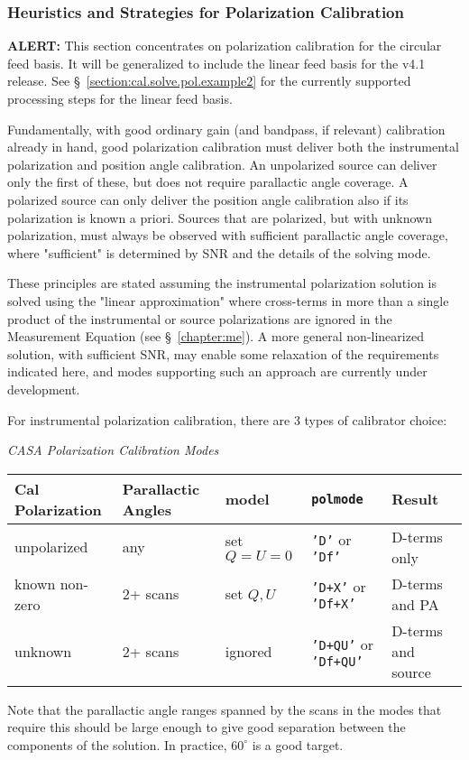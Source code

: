 
\subsubsection{Heuristics and Strategies for Polarization Calibration }
\label{section:cal.solve.pol.hstics}


{\bf ALERT:} This section concentrates on polarization calibration for
the circular feed basis.  It will be generalized to include the linear
feed basis for the v4.1 release.  See
\S~\ref{section:cal.solve.pol.example2} for the currently supported
processing steps for the linear feed basis.


Fundamentally, with good ordinary gain (and bandpass, if relevant)
calibration already in hand, good polarization calibration must
deliver both the instrumental polarization and position angle
calibration.  An unpolarized source can deliver only the first of
these, but does not require parallactic angle coverage.  A polarized
source can only deliver the position angle calibration also if its
polarization is known a priori.  Sources that are polarized, but with
unknown polarization, must always be observed with sufficient
parallactic angle coverage, where "sufficient" is determined by SNR
and the details of the solving mode.

These principles are stated assuming the instrumental polarization
solution is solved using the "linear approximation" where cross-terms
in more than a single product of the instrumental or source
polarizations are ignored in the Measurement Equation (see 
\S~\ref{chapter:me}).
A more general non-linearized solution, with sufficient SNR, may enable 
some relaxation of the requirements indicated here, and modes supporting
such an approach are currently under development.

For instrumental polarization calibration, there are 3 types of
calibrator choice:
\begin{center}
{\it CASA Polarization Calibration Modes}\\[5mm]
\begin{tabular}{|l|l|l|l|l|}
\hline
Cal Polarization & Parallactic Angles & model & 
    {\tt polmode} & Result \\
\hline
unpolarized & any & set $Q=U=0$ & {\tt 'D'} or {\tt 'Df'} & D-terms
  only \\
known non-zero & 2+ scans & set $Q,U$ & {\tt 'D+X'} or 
  {\tt 'Df+X'} & D-terms and PA \\
unknown & 2+ scans & ignored & {\tt 'D+QU'} or {\tt 'Df+QU'} &
  D-terms and source \\
\hline
\end{tabular}
\end{center}
Note that the parallactic angle ranges spanned by the scans in the
modes that require this should be large enough to give good separation
between the components of the solution.  In practice, $60^\circ$ is 
a good target.

